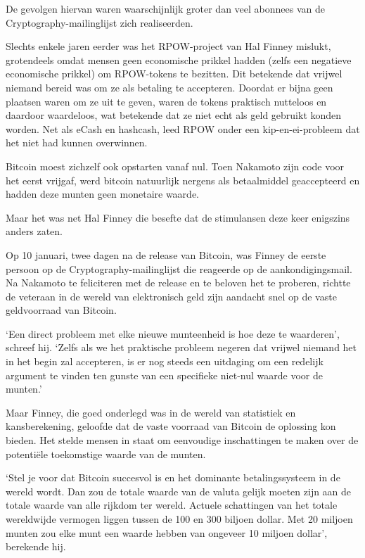 \documentclass[
  a5paper,
  smalldemyvopaper,11pt,twoside,onecolumn,openright,extrafontsizes,
hidelinks]{memoir}
\begin{document}
De gevolgen hiervan waren waarschijnlijk groter dan veel abonnees van de
Cryptography-mailinglijst zich realiseerden.

Slechts enkele jaren eerder was het RPOW-project van Hal Finney mislukt,
grotendeels omdat mensen geen economische prikkel hadden (zelfs een
negatieve economische prikkel) om RPOW-tokens te bezitten. Dit betekende
dat vrijwel niemand bereid was om ze als betaling te accepteren. Doordat
er bijna geen plaatsen waren om ze uit te geven, waren de tokens
praktisch nutteloos en daardoor waardeloos, wat betekende dat ze niet
echt als geld gebruikt konden worden. Net als eCash en hashcash, leed
RPOW onder een kip-en-ei-probleem dat het niet had kunnen overwinnen.

Bitcoin moest zichzelf ook opstarten vanaf nul. Toen Nakamoto zijn code
voor het eerst vrijgaf, werd bitcoin natuurlijk nergens als betaalmiddel
geaccepteerd en hadden deze munten geen monetaire waarde.

Maar het was net Hal Finney die besefte dat de stimulansen deze keer
enigszins anders zaten.

Op 10 januari, twee dagen na de release van Bitcoin, was Finney de
eerste persoon op de Cryptography-mailinglijst die reageerde op de
aankondigingsmail. Na Nakamoto te feliciteren met de release en te
beloven het te proberen, richtte de veteraan in de wereld van
elektronisch geld zijn aandacht snel op de vaste geldvoorraad van
Bitcoin.

`Een direct probleem met elke nieuwe munteenheid is hoe deze te
waarderen', schreef hij. `Zelfs als we het praktische probleem negeren
dat vrijwel niemand het in het begin zal accepteren, is er nog steeds
een uitdaging om een redelijk argument te vinden ten gunste van een
specifieke niet-nul waarde voor de munten.'

Maar Finney, die goed onderlegd was in de wereld van statistiek en
kansberekening, geloofde dat de vaste voorraad van Bitcoin de oplossing
kon bieden. Het stelde mensen in staat om eenvoudige inschattingen te
maken over de potentiële toekomstige waarde van de munten.

`Stel je voor dat Bitcoin succesvol is en het dominante betalingssysteem
in de wereld wordt. Dan zou de totale waarde van de valuta gelijk moeten
zijn aan de totale waarde van alle rijkdom ter wereld. Actuele
schattingen van het totale wereldwijde vermogen liggen tussen de 100 en
300 biljoen dollar. Met 20 miljoen munten zou elke munt een waarde
hebben van ongeveer 10 miljoen dollar', berekende hij.
\end{document}
